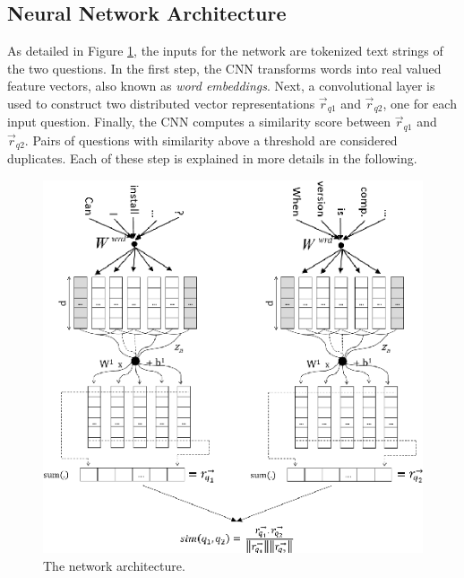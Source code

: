 \documentclass[10pt,twocolumn,letterpaper]{article}
\begin{document}
\subsection{Neural Network Architecture}
As detailed in Figure \ref{fig:network}, the inputs for the network are tokenized text strings of the two questions. In the first step, the CNN transforms words into real valued feature vectors, also known as \emph{word embeddings}. Next, a convolutional layer is used to construct two distributed vector representations $\vec{r}_{q1}$ and $\vec{r}_{q2}$, one for each input question. Finally, the CNN computes a similarity score between $\vec{r}_{q1}$ and $\vec{r}_{q2}$. Pairs of questions with similarity above a threshold are considered duplicates. Each of these step is explained in more details in the following.
\begin{figure}[t]
\begin{center}
\includegraphics[width=0.8\linewidth]{img/network.png}
\end{center}
\caption{The network architecture.}
\label{fig:network}
\end{figure}
\end{document}
